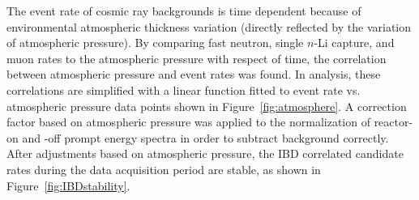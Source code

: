 The event rate of cosmic ray backgrounds is time dependent because of environmental atmospheric thickness variation (directly reflected by the variation of atmospheric pressure).
By comparing fast neutron, single $n$-Li capture, and muon rates to the atmospheric pressure with respect of time, the correlation between atmospheric pressure and event rates was found.
In analysis, these correlations are simplified with a linear function fitted to event rate vs. atmospheric pressure data points shown in Figure~\ref{fig:atmosphere}.
A correction factor based on atmospheric pressure was applied to the normalization of reactor-on and -off prompt energy spectra in order to subtract background correctly.
After adjustments based on atmospheric pressure, the IBD correlated candidate rates during the data acquisition period are stable, as shown in Figure~\ref{fig:IBDstability}. 


